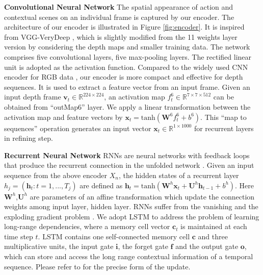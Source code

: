 \documentclass[10pt,twocolumn,letterpaper]{article}
\begin{document}
\noindent \textbf{Convolutional Neural Network} The spatial appearance of action and contextual scenes on an individual frame is captured by our encoder. The architecture of our encoder is illustrated in Figure \ref{fig:encoder}. It is inspired from VGG-VeryDeep \cite{Simonyan15c}, which is slightly modified from the 11 weights layer version by considering the depth maps and smaller training data. The network comprises five convolutional layers, five max-pooling layers. The rectified linear unit \cite{Alex_nips_2012} is adopted as the activation function. Compared to the widely used CNN encoder for RGB data \cite{Mahasseni_2016_CVPR,Simonyan15c}, our encoder is more compact and effective for depth sequences. It is used to extract a feature vector from an input frame. Given an input depth frame $\bm{v}_t \in \mathbb{R}^{224\times224}$, an activation map $f_t^6 \in \mathbb{R}^{7\times7\times512}$ can be obtained from ``outMap6'' layer. We apply a linear transformation between the activation map and feature vectors by $\bm{x}_t=\mathrm{tanh}(\bm{W}^6f_t^6+b^6)$. This ``map to sequences'' operation generates an input vector $\bm{x}_t \in \mathbb{R}^{1\times1000}$ for recurrent layers in refining step.


\noindent \textbf{Recurrent Neural Network} RNNs are neural networks with feedback loops that produce the recurrent connection in the unfolded network \cite{Chung_NIPS2015,Jonas_2016_aaai,Qiang_aaai_2016}.
Given an input sequence from the above encoder $X_n$, the hidden states of a recurrent layer $h_j = (\bm{h}_t : t=1,...,T_j)$ are defined as  $\bm{h}_{t}=\mathrm{tanh}(\bm{W}^{h}\bm{x}_{t}+\bm{U}^{h}\bm{h}_{t-1}+b^h)$. Here $\bm{W}^h$,$\bm{U}^h$ are parameters of an affine transformation which update the connection weights among input layer, hidden layer. RNNs suffer from the vanishing and the exploding gradient problem \cite{Bengio_1994}. We adopt LSTM \cite{Hochreiter_1997} to address the problem of learning long-range dependencies, where a memory cell vector $\bm{c}_t$ is maintained at each time step $t$. 
LSTM contains one self-connected memory cell $\bm{c}$ and three multiplicative units, \ie the input gate $\bm{i}$, the forget gate $\bm{f}$ and the output gate $\bm{o}$, which can store and access the long range contextual information of a temporal sequence. Please refer to \cite{Hochreiter_1997} for the precise form of the update. 
\end{document}
